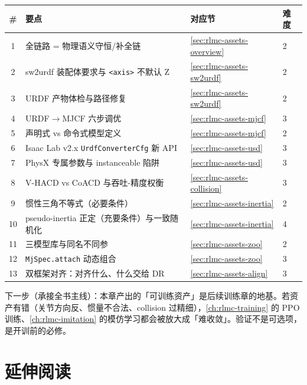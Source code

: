 \begin{center}
\small
\begin{tabular}{@{}clll@{}}
\toprule
\# & 要点 & 对应节 & 难度 \\
\midrule
1 & 全链路 = 物理语义守恒/补全链 & \cref{sec:rlmc-assets-overview} & 2 \\
2 & sw2urdf 装配体要求与 \texttt{<axis>} 不默认 Z & \cref{sec:rlmc-assets-sw2urdf} & 2 \\
3 & URDF 产物体检与路径修复 & \cref{sec:rlmc-assets-sw2urdf} & 2 \\
4 & URDF$\to$MJCF 六步调优 & \cref{sec:rlmc-assets-mjcf} & 3 \\
5 & 声明式 vs 命令式模型定义 & \cref{sec:rlmc-assets-mjcf} & 2 \\
6 & Isaac Lab v2.x \texttt{UrdfConverterCfg} 新 API & \cref{sec:rlmc-assets-usd} & 3 \\
7 & PhysX 专属参数与 instanceable 陷阱 & \cref{sec:rlmc-assets-usd} & 3 \\
8 & V-HACD vs CoACD 与吞吐-精度权衡 & \cref{sec:rlmc-assets-collision} & 3 \\
9 & 惯性三角不等式（必要条件） & \cref{sec:rlmc-assets-inertia} & 2 \\
10 & pseudo-inertia 正定（充要条件）与一致随机化 & \cref{sec:rlmc-assets-inertia} & 4 \\
11 & 三模型库与同名不同参 & \cref{sec:rlmc-assets-zoo} & 2 \\
12 & \texttt{MjSpec.attach} 动态组合 & \cref{sec:rlmc-assets-zoo} & 3 \\
13 & 双框架对齐：对齐什么、什么交给 DR & \cref{sec:rlmc-assets-align} & 3 \\
\bottomrule
\end{tabular}
\end{center}

下一步（承接全书主线）：本章产出的「可训练资产」是后续训练章的地基。若资产有错（关节方向反、惯量不合法、collision 过精细），\cref{ch:rlmc-training} 的 PPO 训练、\cref{ch:rlmc-imitation} 的模仿学习都会被放大成「难收敛」。验证不是可选项，是开训前的必修。

\section*{延伸阅读}
\label{sec:rlmc-assets-further}

